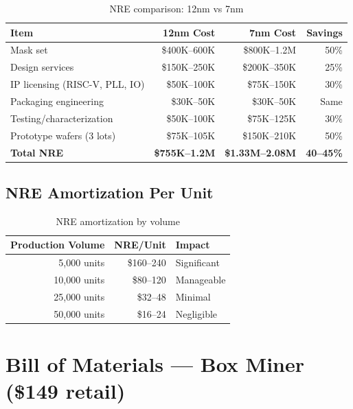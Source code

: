 \documentclass[11pt,a4paper]{article}
\begin{document}
\begin{table}[h]
\centering
\begin{tabular}{lrrr}
\toprule
\textbf{Item} & \textbf{12nm Cost} & \textbf{7nm Cost} & \textbf{Savings} \\
\midrule
Mask set & \$400K--600K & \$800K--1.2M & 50\% \\
Design services & \$150K--250K & \$200K--350K & 25\% \\
IP licensing (RISC-V, PLL, IO) & \$50K--100K & \$75K--150K & 30\% \\
Packaging engineering & \$30K--50K & \$30K--50K & Same \\
Testing/characterization & \$50K--100K & \$75K--125K & 30\% \\
Prototype wafers (3 lots) & \$75K--105K & \$150K--210K & 50\% \\
\midrule
\textbf{Total NRE} & \textbf{\$755K--1.2M} & \textbf{\$1.33M--2.08M} & \textbf{40--45\%} \\
\bottomrule
\end{tabular}
\caption{NRE comparison: 12nm vs 7nm}
\end{table}

\subsection{NRE Amortization Per Unit}

\begin{table}[h]
\centering
\begin{tabular}{rrl}
\toprule
\textbf{Production Volume} & \textbf{NRE/Unit} & \textbf{Impact} \\
\midrule
5,000 units & \$160--240 & Significant \\
10,000 units & \$80--120 & Manageable \\
25,000 units & \$32--48 & Minimal \\
50,000 units & \$16--24 & Negligible \\
\bottomrule
\end{tabular}
\caption{NRE amortization by volume}
\end{table}

\section{Bill of Materials --- Box Miner (\$149 retail)}
\end{document}
